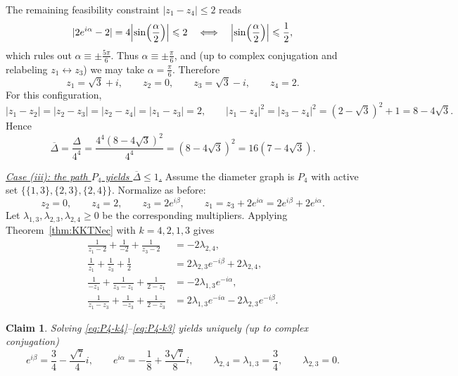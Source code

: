 \documentclass{article}
\newtheorem{claim}[thr]{Claim}
\theoremstyle{definition}
\let\le\leqslant
\let\ge\geqslant
\newcounter{row}
\begin{document}
The remaining feasibility constraint \(|z_1-z_4|\le 2\) reads
\[
|2e^{i\alpha}-2|=4\Bigl|\sin\Bigl(\frac{\alpha}{2}\Bigr)\Bigr|\le 2
\quad\Longleftrightarrow\quad
\Bigl|\sin\Bigl(\frac{\alpha}{2}\Bigr)\Bigr|\le \frac12,
\]
which rules out \(\alpha\equiv \pm\frac{5\pi}{6}\).
Thus \(\alpha\equiv \pm\frac{\pi}{6}\), and (up to complex conjugation and relabeling \(z_1\leftrightarrow z_3\)) we may take \(\alpha=\frac{\pi}{6}\).
Therefore
\[
z_1=\sqrt3+i,\qquad z_2=0,\qquad z_3=\sqrt3-i,\qquad z_4=2.
\]
For this configuration,
\[
|z_1-z_2|=|z_2-z_3|=|z_2-z_4|=|z_1-z_3|=2,\qquad
|z_1-z_4|^2=|z_3-z_4|^2=(2-\sqrt3)^2+1=8-4\sqrt3.
\]
Hence
\[
\overline{\Delta}=\frac{\Delta}{4^4}
=\frac{4^4(8-4\sqrt3)^2}{4^4}
=(8-4\sqrt3)^2
=16(7-4\sqrt3).
\]

\smallskip
\noindent\underline{\emph{Case (iii): the path \(P_4\) yields \(\overline{\Delta}\le 1\).}}
Assume the diameter graph is $P_4$ with active set
\(
\{\{1,3\},\{2,3\},\{2,4\}\}.
\)
Normalize as before:
\[
z_2=0,\qquad z_4=2,\qquad z_3=2e^{i\beta},\qquad z_1=z_3+2e^{i\alpha}=2e^{i\beta}+2e^{i\alpha}.
\]
Let \(\lambda_{1,3},\lambda_{2,3},\lambda_{2,4}\ge 0\) be the corresponding multipliers.
Applying Theorem~\ref{thm:KKTNec} with \(k=4,2,1,3\) gives
\begin{align}
\frac1{z_1-2}+\frac1{-2}+\frac1{z_3-2} &= -2\lambda_{2,4}, \label{eq:P4-k4}\\
\frac1{z_1}+\frac1{z_3}+\frac1{2} &= 2\lambda_{2,3}e^{-i\beta}+2\lambda_{2,4}, \label{eq:P4-k2}\\
\frac1{-z_1}+\frac1{z_3-z_1}+\frac1{2-z_1} &= -2\lambda_{1,3}e^{-i\alpha}, \label{eq:P4-k1}\\
\frac1{z_1-z_3}+\frac1{-z_3}+\frac1{2-z_3} &= 2\lambda_{1,3}e^{-i\alpha}-2\lambda_{2,3}e^{-i\beta}. \label{eq:P4-k3}
\end{align}

\begin{claim}\label{claim:solve_equations_vv1}
Solving \eqref{eq:P4-k4}--\eqref{eq:P4-k3} yields uniquely (up to complex conjugation)
\[
e^{i\beta}=\frac34-\frac{\sqrt7}{4}i,\qquad
e^{i\alpha}=-\frac18+\frac{3\sqrt7}{8}i,\qquad
\lambda_{2,4}=\lambda_{1,3}=\frac34,\qquad
\lambda_{2,3}=0.
\]    
\end{claim}
\end{document}
